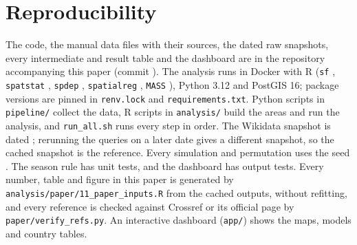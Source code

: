 \section{Reproducibility}
\label{sec:repro}

The code, the manual data files with their sources, the dated raw snapshots, every intermediate and result table and the dashboard are in the repository accompanying this paper (commit \commitHash). The analysis runs in Docker with R \Rversion{} (\texttt{sf} \versf, \texttt{spatstat} \verspatstat, \texttt{spdep} \verspdep, \texttt{spatialreg} \verspatialreg, \texttt{MASS} \verMASS), Python 3.12 and PostGIS 16; package versions are pinned in \texttt{renv.lock} and \texttt{requirements.txt}. Python scripts in \texttt{pipeline/} collect the data, R scripts in \texttt{analysis/} build the areas and run the analysis, and \texttt{run\_all.sh} runs every step in order. The Wikidata snapshot is dated \snapshotDate; rerunning the queries on a later date gives a different snapshot, so the cached snapshot is the reference. Every simulation and permutation uses the seed \seed. The season rule has unit tests, and the dashboard has output tests. Every number, table and figure in this paper is generated by \texttt{analysis/paper/11\_paper\_inputs.R} from the cached outputs, without refitting, and every reference is checked against Crossref or its official page by \texttt{paper/verify\_refs.py}. An interactive dashboard (\texttt{app/}) shows the maps, models and country tables.

